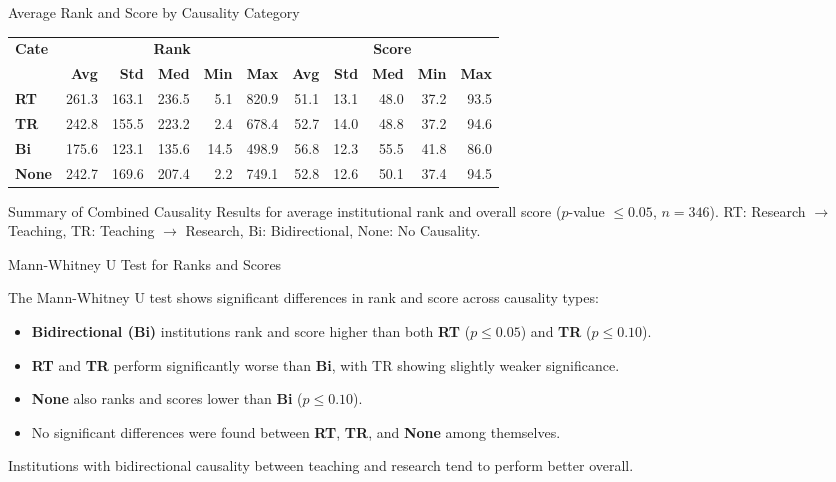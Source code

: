 \documentclass[aspectratio=169, table]{beamer}
\begin{document}
\begin{frame}[fragile]{Average Rank and Score by Causality Category}
	\vspace{20pt}
	\setlength{\arrayrulewidth}{0.3pt}
	\begin{center}
		\begin{tabular}{|l|r|r|r|r|r||r|r|r|r|r|}
			\hline
			\multirow{2}{*}{\textbf{Cate}} 
			& \multicolumn{5}{c||}{\textbf{Rank}} 
			& \multicolumn{5}{c|}{\textbf{Score}} \\ \cline{2-11}
			& \textbf{Avg} & \textbf{Std} & \textbf{Med} & \textbf{Min} & \textbf{Max}
			& \textbf{Avg} & \textbf{Std} & \textbf{Med} & \textbf{Min} & \textbf{Max} \\ \hline
			\textbf{RT}   & 261.3 & 163.1 & 236.5 & 5.1   & 820.9 & 51.1 & 13.1 & 48.0 & 37.2 & 93.5 \\ \hline
			\textbf{TR}   & 242.8 & 155.5 & 223.2 & 2.4   & 678.4 & 52.7 & 14.0 & 48.8 & 37.2 & 94.6 \\ \hline
			\textbf{Bi}   & 175.6 & 123.1 & 135.6 & 14.5  & 498.9 & 56.8 & 12.3 & 55.5 & 41.8 & 86.0 \\ \hline
			\textbf{None} & 242.7 & 169.6 & 207.4 & 2.2   & 749.1 & 52.8 & 12.6 & 50.1 & 37.4 & 94.5 \\ \hline
		\end{tabular}
	\end{center}
	
	\vspace{8pt}
	Summary of Combined Causality Results for average institutional rank and overall score ($p$-value $\leq 0.05$, $n=346$). RT: Research $\rightarrow$ Teaching, TR: Teaching $\rightarrow$ Research, Bi: Bidirectional, None: No Causality.
\end{frame}




\begin{frame}[fragile]{Mann-Whitney U Test for Ranks and Scores}
	\vspace{20pt}
	
	The Mann-Whitney U test shows significant differences in rank and score across causality types:
	
	\begin{itemize}
		\item \textbf{Bidirectional (Bi)} institutions rank and score higher than both \textbf{RT} ($p \leq 0.05$) and \textbf{TR} ($p \leq 0.10$).
		\item \textbf{RT} and \textbf{TR} perform significantly worse than \textbf{Bi}, with TR showing slightly weaker significance.
		\item \textbf{None} also ranks and scores lower than \textbf{Bi} ($p \leq 0.10$).
		\item No significant differences were found between \textbf{RT}, \textbf{TR}, and \textbf{None} among themselves.
	\end{itemize}
	
	Institutions with bidirectional causality between teaching and research tend to perform better overall.
\end{frame}
\end{document}
